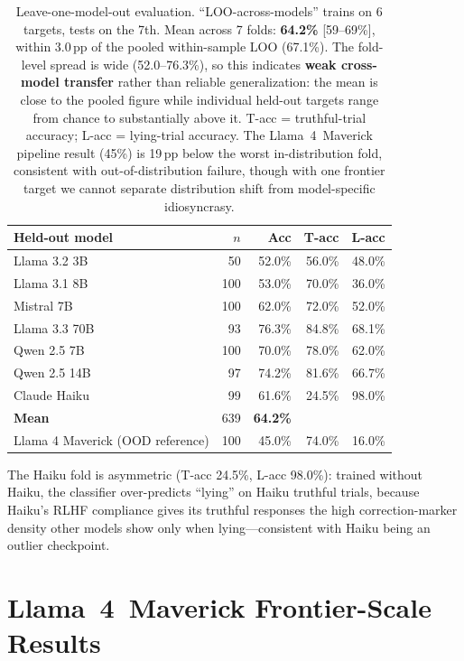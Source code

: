 \begin{table}[h]
\centering
\caption{Leave-one-model-out evaluation. ``LOO-across-models'' trains on 6 targets, tests on the 7th. Mean across 7 folds: \textbf{64.2\%} [59--69\%], within 3.0\,pp of the pooled within-sample LOO (67.1\%). The fold-level spread is wide (52.0--76.3\%), so this indicates \textbf{weak cross-model transfer} rather than reliable generalization: the mean is close to the pooled figure while individual held-out targets range from chance to substantially above it. T-acc = truthful-trial accuracy; L-acc = lying-trial accuracy. The Llama~4~Maverick pipeline result (45\%) is 19\,pp below the worst in-distribution fold, consistent with out-of-distribution failure, though with one frontier target we cannot separate distribution shift from model-specific idiosyncrasy.}
\label{tab:loo_across_models}
\begin{tabular}{lrrrr}
\toprule
\textbf{Held-out model} & \textbf{$n$} & \textbf{Acc} & \textbf{T-acc} & \textbf{L-acc} \\
\midrule
Llama 3.2 3B   & 50  & 52.0\% & 56.0\% & 48.0\% \\
Llama 3.1 8B   & 100 & 53.0\% & 70.0\% & 36.0\% \\
Mistral 7B     & 100 & 62.0\% & 72.0\% & 52.0\% \\
Llama 3.3 70B  & 93  & 76.3\% & 84.8\% & 68.1\% \\
Qwen 2.5 7B    & 100 & 70.0\% & 78.0\% & 62.0\% \\
Qwen 2.5 14B   & 97  & 74.2\% & 81.6\% & 66.7\% \\
Claude Haiku   & 99  & 61.6\% & 24.5\% & 98.0\% \\
\midrule
\textbf{Mean} & 639 & \textbf{64.2\%} & & \\
\midrule
Llama 4 Maverick (OOD reference) & 100 & 45.0\% & 74.0\% & 16.0\% \\
\bottomrule
\end{tabular}
\end{table}

The Haiku fold is asymmetric (T-acc 24.5\%, L-acc 98.0\%): trained without Haiku, the classifier over-predicts ``lying'' on Haiku truthful trials, because Haiku's RLHF compliance gives its truthful responses the high correction-marker density other models show only when lying---consistent with Haiku being an outlier checkpoint.

\section{Llama~4~Maverick Frontier-Scale Results}\label{app:llama405b_results}

